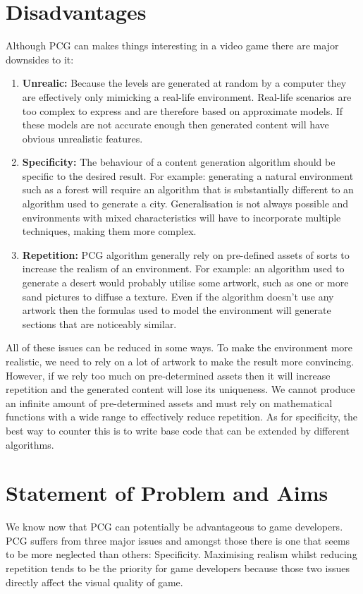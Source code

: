 	\section{Disadvantages}
Although PCG can makes things interesting in a video game there are major downsides to it:
\begin{enumerate}
\item {\bf Unrealic:} Because the levels are generated at random by a computer they are effectively only mimicking a real-life environment. Real-life scenarios are too complex to express and are therefore based on approximate models. If these models are not accurate enough then generated content will have obvious unrealistic features.

\item {\bf Specificity:} The behaviour of a content generation algorithm should be specific to the desired result. For example: generating a natural environment such as a forest will require an algorithm that is substantially different to an algorithm used to generate a city. Generalisation is not always possible and environments with mixed characteristics will have to incorporate multiple techniques, making them more complex.

\item {\bf Repetition:} PCG algorithm generally rely on pre-defined assets of sorts to increase the realism of an environment. For example: an algorithm used to generate a desert would probably utilise some artwork, such as one or more sand pictures to diffuse a texture. Even if the algorithm doesn't use any artwork then the formulas used to model the environment will generate sections that are noticeably similar.
\end{enumerate}

All of these issues can be reduced in some ways. To make the environment more realistic, we need to rely on a lot of artwork to make the result more convincing. However, if we rely too much on pre-determined assets then it will increase repetition and the generated content will lose its uniqueness. We cannot produce an infinite amount of pre-determined assets and must rely on mathematical functions with a wide range to effectively reduce repetition. As for specificity, the best way to counter this is to write base code that can be extended by different algorithms.


	\section{Statement of Problem and Aims}
We know now that PCG can potentially be advantageous to game developers. PCG suffers from three major issues and amongst those there is one that seems to be more neglected than others: Specificity. Maximising realism whilst reducing repetition tends to be the priority for game developers because those two issues directly affect the visual quality of game. 

